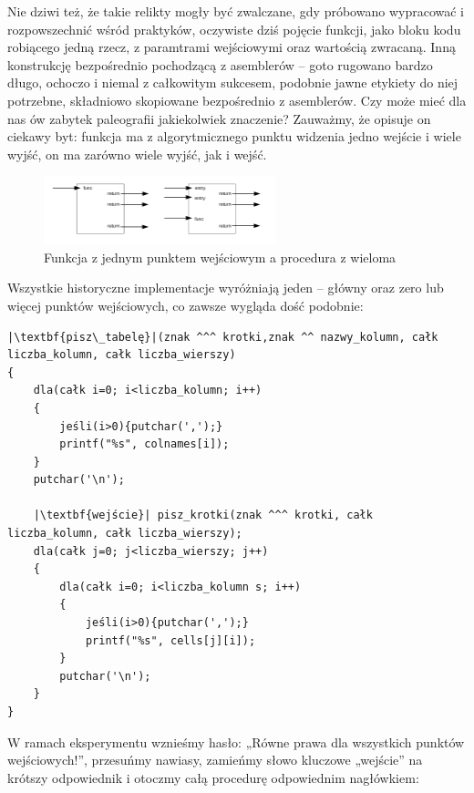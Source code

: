 Nie dziwi też, że takie relikty mogły być zwalczane, gdy próbowano wypracować i rozpowszechnić wśród praktyków, oczywiste dziś pojęcie funkcji, jako bloku kodu robiącego jedną rzecz, z paramtrami wejściowymi oraz wartością zwracaną. Inną konstrukcję bezpośrednio pochodzącą z asemblerów – goto rugowano bardzo długo, ochoczo i niemal z całkowitym sukcesem, podobnie jawne etykiety do niej potrzebne, składniowo skopiowane bezpośrednio z asemblerów. Czy może mieć dla nas ów zabytek paleografii jakiekolwiek znaczenie? Zauważmy, że opisuje on ciekawy byt: funkcja ma z algorytmicznego punktu widzenia jedno wejście i wiele wyjść, on ma zarówno wiele wyjść, jak i wejść.
\begin{figure}[h]
    \centering
    \includegraphics[width=0.6\textwidth]{images/wywod/pudelka.png}
    \caption{Funkcja z jednym punktem wejściowym a procedura z wieloma}
\end{figure}

Wszystkie historyczne implementacje wyróżniają jeden – główny oraz zero lub więcej punktów wejściowych, co zawsze wygląda dość podobnie:


\lstset{
    escapechar=|,
    breaklines=true
}
\begin{lstlisting}
|\textbf{pisz\_tabelę}|(znak ^^^ krotki,znak ^^ nazwy_kolumn, całk liczba_kolumn, całk liczba_wierszy)
{
    dla(całk i=0; i<liczba_kolumn; i++)
    {
        jeśli(i>0){putchar(',');}
        printf("%s", colnames[i]);
    }
    putchar('\n');
    
    |\textbf{wejście}| pisz_krotki(znak ^^^ krotki, całk liczba_kolumn, całk liczba_wierszy);
    dla(całk j=0; j<liczba_wierszy; j++)
    {
        dla(całk i=0; i<liczba_kolumn s; i++)
        {
            jeśli(i>0){putchar(',');}
            printf("%s", cells[j][i]);
        }
        putchar('\n');
    }
}
\end{lstlisting}
W ramach eksperymentu wznieśmy hasło: „Równe prawa dla wszystkich punktów wejściowych!”, przesuńmy nawiasy,  zamieńmy słowo kluczowe „wejście” na krótszy odpowiednik i otoczmy całą procedurę odpowiednim nagłówkiem:

